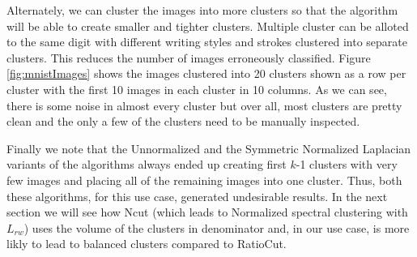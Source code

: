 \documentclass[10pt,a4paper, nocenter]{report}
\begin{document}
\begin{enumerate}
        Alternately, we can cluster the images into more clusters so that the algorithm will be able to create smaller and tighter clusters. Multiple cluster can be alloted to the same digit with different writing styles and strokes clustered into separate clusters. This reduces the number of images erroneously classified. Figure \ref{fig:mnistImages} shows the images clustered into 20 clusters shown as a row per cluster with the first 10 images in each cluster in 10 columns. As we can see, there is some noise in almost every cluster but over all, most clusters are pretty clean and the only a few of the clusters need to be manually inspected. 

        Finally we note that the Unnormalized and the Symmetric Normalized Laplacian variants of the algorithms always ended up creating first $k$-1 clusters with very few images and placing all of the remaining images into one cluster. Thus, both these algorithms, for this use case, generated undesirable results. In the next section we will see how Ncut (which leads to Normalized spectral clustering with $L_{rw}$) uses the volume of the clusters in denominator and, in our use case, is more likly to lead to balanced clusters compared to RatioCut.


\end{enumerate}
\end{document}
